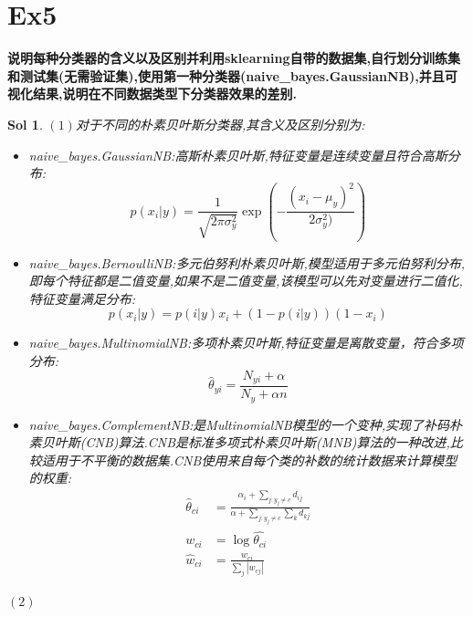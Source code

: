 \documentclass[UTF8,a4paper,11pt]{ctexart}
\newtheorem{sol}{Sol}[section]
\begin{document}
\section{Ex5}
\textbf{说明每种分类器的含义以及区别并利用sklearning自带的数据集,自行划分训练集和测试集(无需验证集),使用第一种分类器(naive\_bayes.GaussianNB),并且可视化结果,说明在不同数据类型下分类器效果的差别.}
\begin{sol}
	$(1)$对于不同的朴素贝叶斯分类器,其含义及区别分别为:
	\begin{itemize}
	\item naive\_bayes.GaussianNB:高斯朴素贝叶斯,特征变量是连续变量且符合高斯分布:$$p(x_{i}|y)=\frac{1}{\sqrt{2\pi\sigma_{y}^{2}}}\exp(-\frac{(x_{i}-\mu_{y})^{2}}{2\sigma_{y}^{2})})$$
	\item naive\_bayes.BernoulliNB:多元伯努利朴素贝叶斯,模型适用于多元伯努利分布,即每个特征都是二值变量,如果不是二值变量,该模型可以先对变量进行二值化,特征变量满足分布:$$p(x_{i}|y)=p(i|y)x_{i}+(1-p(i|y))(1-x_{i})$$
	\item naive\_bayes.MultinomialNB:多项朴素贝叶斯,特征变量是离散变量，符合多项分布:$$\hat{\theta}_{yi}=\frac{N_{yi}+\alpha}{N_{y}+\alpha n}$$
	\item
	naive\_bayes.ComplementNB:是MultinomialNB模型的一个变种,实现了补码朴素贝叶斯(CNB)算法.CNB是标准多项式朴素贝叶斯(MNB)算法的一种改进,比较适用于不平衡的数据集.CNB使用来自每个类的补数的统计数据来计算模型的权重:
	\begin{equation*}
		\begin{split}
			\hat{\theta}_{ci}&=\frac{\alpha_{i}+\sum_{j:y_{j}\ne c}d_{ij}}{\alpha+\sum_{j:y_{j}\ne c}\sum_{k}d_{kj}}\\
			w_{ci}&=\log\hat{\theta_{ci}}\\
			\hat{w}_{ci}&=\frac{w_{ci}}{\sum_{j}|w_{cj}|}
		\end{split}
	\end{equation*}
	\end{itemize}
$(2)$
\begin{figure}[H]
	\centering

\end{figure}
\end{sol}
\end{document}
